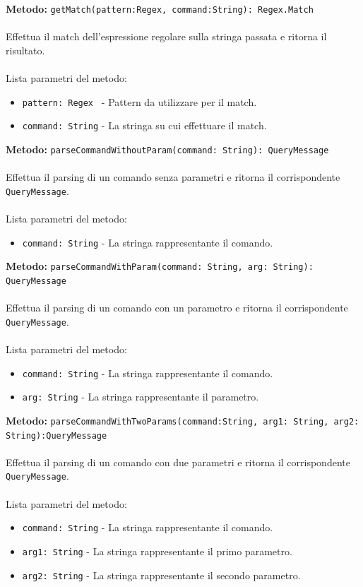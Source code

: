 \documentclass[a4paper]{article}
\begin{document}
			\textbf{Metodo: }\texttt{getMatch(pattern:Regex, command:String): Regex.Match}
			\\ \\
			Effettua il match dell'espressione regolare sulla stringa passata e ritorna il risultato.
			\\ \\
			Lista parametri del metodo:
			\begin{itemize}
				\item \texttt{pattern: Regex } - Pattern da utilizzare per il match.
				\item \texttt{command: String} - La stringa su cui effettuare il match.
			\end{itemize}
			\textbf{Metodo: }\texttt{parseCommandWithoutParam(command: String): QueryMessage}
			\\ \\
			Effettua il parsing di un comando senza parametri e ritorna il corrispondente \texttt{QueryMessage}.
			\\ \\
			Lista parametri del metodo:
			\begin{itemize}
				\item \texttt{command: String} - La stringa rappresentante il comando.
			\end{itemize}
			\textbf{Metodo: }\texttt{parseCommandWithParam(command: String, arg: String): QueryMessage}
			\\ \\
			Effettua il parsing di un comando con un parametro e ritorna il corrispondente \texttt{QueryMessage}.
			\\ \\
			Lista parametri del metodo:
			\begin{itemize}
				\item \texttt{command: String} - La stringa rappresentante il comando.
				\item \texttt{arg: String} - La stringa rappresentante il parametro.
			\end{itemize}
			\textbf{Metodo: }\texttt{parseCommandWithTwoParams(command:String, arg1: String, arg2: String):QueryMessage}
			\\ \\
			Effettua il parsing di un comando con due parametri e ritorna il corrispondente \texttt{QueryMessage}.
			\\ \\
			Lista parametri del metodo:
			\begin{itemize}
				\item \texttt{command: String} - La stringa rappresentante il comando.
				\item \texttt{arg1: String} - La stringa rappresentante il primo parametro.
				\item \texttt{arg2: String} - La stringa rappresentante il secondo parametro.
			\end{itemize}
\end{document}
